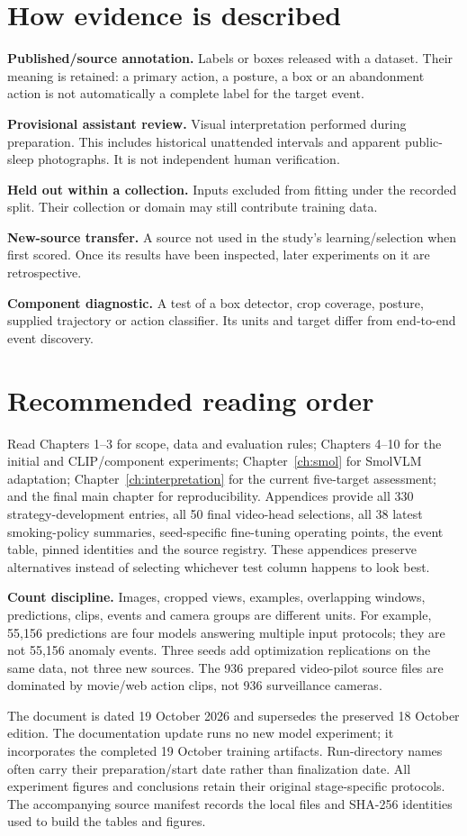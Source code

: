 \section*{How evidence is described}
\textbf{Published/source annotation.} Labels or boxes released with a dataset. Their meaning is retained: a primary action, a posture, a box or an abandonment action is not automatically a complete label for the target event.

\textbf{Provisional assistant review.} Visual interpretation performed during preparation. This includes historical unattended intervals and apparent public-sleep photographs. It is not independent human verification.

\textbf{Held out within a collection.} Inputs excluded from fitting under the recorded split. Their collection or domain may still contribute training data.

\textbf{New-source transfer.} A source not used in the study's learning/selection when first scored. Once its results have been inspected, later experiments on it are retrospective.

\textbf{Component diagnostic.} A test of a box detector, crop coverage, posture, supplied trajectory or action classifier. Its units and target differ from end-to-end event discovery.

\section*{Recommended reading order}
Read Chapters 1--3 for scope, data and evaluation rules; Chapters 4--10 for the initial and CLIP/component experiments; Chapter~\ref{ch:smol} for SmolVLM adaptation; Chapter~\ref{ch:interpretation} for the current five-target assessment; and the final main chapter for reproducibility. Appendices provide all 330 strategy-development entries, all 50 final video-head selections, all 38 latest smoking-policy summaries, seed-specific fine-tuning operating points, the event table, pinned identities and the source registry. These appendices preserve alternatives instead of selecting whichever test column happens to look best.

\textbf{Count discipline.} Images, cropped views, examples, overlapping windows, predictions, clips, events and camera groups are different units. For example, 55,156 predictions are four models answering multiple input protocols; they are not 55,156 anomaly events. Three seeds add optimization replications on the same data, not three new sources. The 936 prepared video-pilot source files are dominated by movie/web action clips, not 936 surveillance cameras.

The document is dated 19 October 2026 and supersedes the preserved 18 October edition. The documentation update runs no new model experiment; it incorporates the completed 19 October training artifacts. Run-directory names often carry their preparation/start date rather than finalization date. All experiment figures and conclusions retain their original stage-specific protocols. The accompanying source manifest records the local files and SHA-256 identities used to build the tables and figures.
